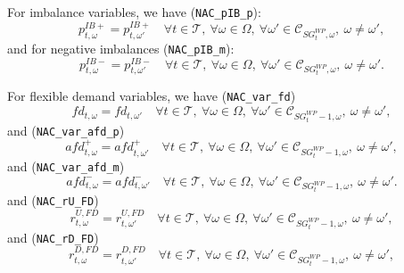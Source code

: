 \documentclass{article}
\begin{document}
For imbalance variables, we have (\verb|NAC_pIB_p|):
\begin{equation} \label{EQ:NAC_pPIB}
	p^{IB+}_{t, \omega} = p^{IB+}_{t, \omega'} \quad \forall t \in \mathcal{T}, \ \forall \omega \in \Omega, \ \forall \omega' \in \mathcal{C}_{SG^{WP}_t, \omega}, \ \omega \neq \omega',
\end{equation}
and for negative imbalances (\verb|NAC_pIB_m|):
\begin{equation} \label{EQ:NAC_pNIB}
	p^{IB-}_{t, \omega} = p^{IB-}_{t, \omega'} \quad \forall t \in \mathcal{T}, \ \forall \omega \in \Omega, \ \forall \omega' \in \mathcal{C}_{SG^{WP}_t, \omega}, \ \omega \neq \omega'.
\end{equation}


For flexible demand variables, we have (\verb|NAC_var_fd|)
\begin{equation} \label{EQ:NAC_var_fd}
	fd_{t, \omega} = fd_{t, \omega'} \quad \forall t \in \mathcal{T}, \ \forall \omega \in \Omega, \ \forall \omega' \in \mathcal{C}_{SG^{WP}_t - 1, \omega}, \ \omega \neq \omega',
\end{equation}
and (\verb|NAC_var_afd_p|)
\begin{equation} \label{EQ:NAC_var_afd_p}
	afd^+_{t, \omega} = afd^+_{t, \omega'} \quad \forall t \in \mathcal{T}, \ \forall \omega \in \Omega, \ \forall \omega' \in \mathcal{C}_{SG^{WP}_t - 1, \omega}, \ \omega \neq \omega',
\end{equation}
and (\verb|NAC_var_afd_m|)
\begin{equation} \label{EQ:NAC_var_afd_m}
	afd^-_{t, \omega} = afd^-_{t, \omega'} \quad \forall t \in \mathcal{T}, \ \forall \omega \in \Omega, \ \forall \omega' \in \mathcal{C}_{SG^{WP}_t - 1, \omega}, \ \omega \neq \omega'.
\end{equation}
and (\verb|NAC_rU_FD|)
\begin{equation} \label{EQ:NAC_rUFD}
	r^{U,FD}_{t, \omega} = r^{U,FD}_{t, \omega'} \quad \forall t \in \mathcal{T},\ \forall \omega \in \Omega,\ \forall \omega' \in \mathcal{C}_{SG^{WP}_t - 1, \omega},\ \omega \neq \omega',
\end{equation}
and (\verb|NAC_rD_FD|)
\begin{equation} \label{EQ:NAC_rDFD}
	r^{D,FD}_{t, \omega} = r^{D,FD}_{t, \omega'} \quad \forall t \in \mathcal{T},\ \forall \omega \in \Omega,\ \forall \omega' \in \mathcal{C}_{SG^{WP}_t - 1, \omega},\ \omega \neq \omega',
\end{equation}
\end{document}

